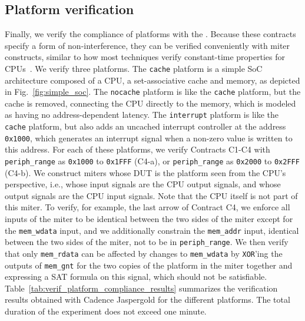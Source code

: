 \subsection{Platform verification}
\label{subsec:pici_platform_verif}

Finally, we verify the compliance of platforms with the \pic.
Because these contracts specify a form of non-interference, they can be verified conveniently with miter constructs, similar to how most techniques verify constant-time properties for CPUs~\cite{dinesh2024conjunct,dinesh2025h,wang2023specification,tan2025contractshadowlogic}.
We verify three platforms.
The \texttt{cache} platform is a simple SoC architecture composed of a CPU, a set-associative cache and memory, as depicted in Fig.~\ref{fig:simple_soc}.
The \texttt{nocache} platform is like the \texttt{cache} platform, but the cache is removed, connecting the CPU directly to the memory, which is modeled as having no address-dependent latency.
The \texttt{interrupt} platform is like the \texttt{cache} platform, but also adds an uncached interrupt controller at the address \texttt{0x1000}, which generates an interrupt signal when a non-zero value is written to this address.
For each of these platforms, we verify Contracts C1-C4 with \texttt{periph\_range} as \texttt{0x1000} to \texttt{0x1FFF} (C4-a), or \texttt{periph\_range} as \texttt{0x2000} to \texttt{0x2FFF} (C4-b).
We construct miters whose DUT is the platform seen from the CPU's perspective, i.e., whose input signals are the CPU output signals, and whose output signals are the CPU input signals.
Note that the CPU itself is not part of this miter.
To verify, for example, the last arrow of Contract C4, we enforce all inputs of the miter to be identical between the two sides of the miter except for the \texttt{mem\_wdata} input, and we additionally constrain the \texttt{mem\_addr} input, identical between the two sides of the miter, not to be in \texttt{periph\_range}.
We then verify that only \texttt{mem\_rdata} can be affected by changes to \texttt{mem\_wdata} by \texttt{XOR}'ing the outputs of \texttt{mem\_gnt} for the two copies of the platform in the miter together and expressing a SAT formula on this signal, which should not be satisfiable.
Table~\ref{tab:verif_platform_compliance_results} summarizes the verification results obtained with Cadence Jaspergold for the different platforms.
The total duration of the experiment does not exceed one minute.
